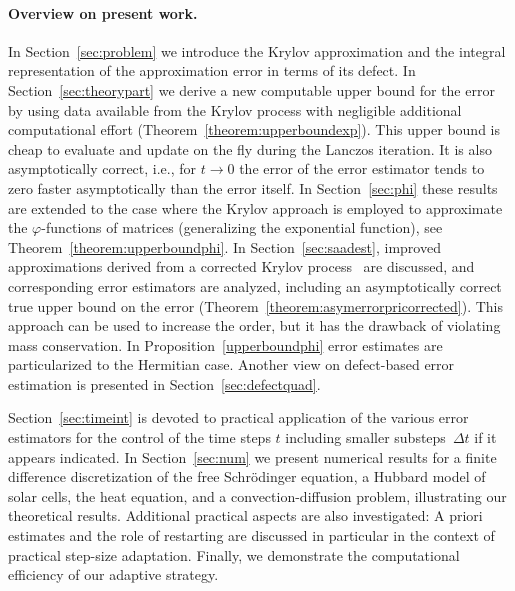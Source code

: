 \documentclass[smallextended]{svjour3pre}%
\numberwithin{equation}{section}
\numberwithin{figure}{section}
\numberwithin{table}{section}
\newcommand\tjnew[1]{{#1}}
\newcommand\phif\varphi
\newcommand\x[1]{\textcolor{red}{#1}}
\begin{document}
\paragraph{Overview on present work.}

In Section~\ref{sec:problem} we introduce the Krylov approximation
and the integral representation of the approximation error in terms of its defect.
\tjnew{In Section~\ref{sec:theorypart}
we derive a new computable upper bound for the error
by using data available from the Krylov process
with negligible additional computational effort (Theorem~\ref{theorem:upperboundexp}).}
This upper bound is cheap to evaluate and update on the fly
during the Lanczos iteration.
It is also asymptotically correct,
i.e., for $ t \to 0 $ the error of the error estimator tends
to zero faster asymptotically than the error itself. %
In Section~\ref{sec:phi} these results are extended to the case
where the Krylov approach is employed to approximate
the $\phif$-functions of matrices (generalizing
the exponential function), see Theorem~\ref{theorem:upperboundphi}.
In Section~\ref{sec:saadest},
improved approximations derived from \tjnew{a corrected}
Krylov process~\cite{saad92s} are discussed, and corresponding
error estimators are analyzed,
including an asymptotically correct \tjnew{true} upper bound on the
error (Theorem~\ref{theorem:asymerrorpricorrected}).
This approach can be used to increase the order, but it has the drawback
of violating mass conservation.
In Proposition~\ref{upperboundphi} error estimates are particularized
to the Hermitian case.
Another view on defect-based error estimation is presented
in Section~\ref{sec:defectquad}.

Section~\ref{sec:timeint} is devoted to practical application of the
various error estimators for the control of the time steps $ t $
including smaller substeps~$ \Delta t $ if it appears indicated.
In Section~\ref{sec:num} we present
numerical results \tjnew{for a finite difference discretization of
the free Schr{\"o}dinger equation, a Hubbard model of solar cells,
the heat equation,
and a convection-diffusion problem,}
illustrating our theoretical results. Additional practical
aspects are also investigated:
A priori estimates and the role of restarting are discussed in particular
in the context of practical step-size adaptation.
Finally, we demonstrate the computational efficiency of our adaptive strategy.

\end{document}
